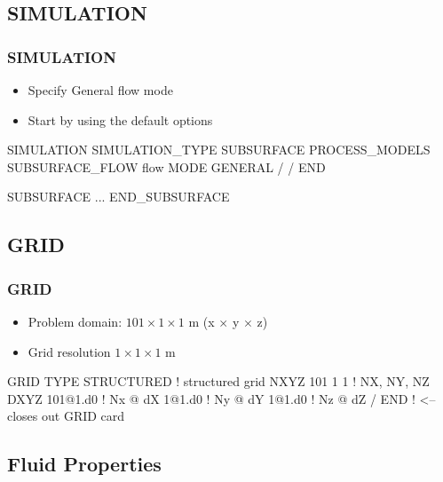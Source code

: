 \documentclass{beamer}
\newcommand\bluecomment[1]{{{\color{blue} #1}}}
\begin{document}
\subsection{SIMULATION}

\begin{frame}[fragile]\frametitle{SIMULATION}

\begin{itemize}
\item Specify General flow mode
\item Start by using the default options
\end{itemize}


\begin{semiverbatim}

SIMULATION
  SIMULATION_TYPE SUBSURFACE
  PROCESS_MODELS
    SUBSURFACE_FLOW flow
      MODE GENERAL
    /
  /
END

SUBSURFACE
 ...
END_SUBSURFACE
\end{semiverbatim}

\end{frame}

\subsection{GRID}
\begin{frame}\frametitle{GRID}

\begin{itemize}
  \item Problem domain: $101 \times 1 \times 1$ m (x $\times$ y $\times$ z)
  \item Grid resolution $1 \times 1 \times 1$ m
\end{itemize}

\begin{semiverbatim}
GRID
  TYPE STRUCTURED        \bluecomment{! structured grid}
  NXYZ 101 1 1           \bluecomment{! NX, NY, NZ}
  DXYZ            
    101@1.d0   \bluecomment{! Nx @ dX}
    1@1.d0  \bluecomment{! Ny @ dY}
    1@1.d0  \bluecomment{! Nz @ dZ}
  /  
END  \bluecomment{! <-- closes out GRID card}
\end{semiverbatim}

\end{frame}

\subsection{Fluid Properties}
\end{document}

